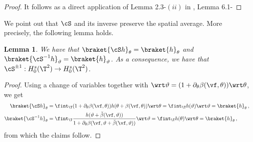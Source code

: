 \documentclass[a4paper,reqno,10pt]{article}
\newtheorem{lem}{Lemma}[section]
\newcommand{\pa}{\partial}
\begin{document}
\begin{proof}
	It follows as a direct application of Lemma 2.3-$(ii)$ in \cite{BM20}, Lemma 6.1-
\end{proof}
We point out that  $\cS$ and its inverse preserve the spatial average. More precisely, the following lemma holds.
\begin{lem}
	We have that $\braket{\cS h}_{\theta}=\braket{h}_{\theta}$ and $\braket{\cS^{-1}h}_{\vartheta} = \braket{h}_{\vartheta}$. As a consequence, we have that $\cS^{\pm 1}:H_0^{s}(\T^2)\to H_0^{s}(\T^2)$.
\end{lem}
\begin{proof}
	Using a change of variables together with $\wrt\vartheta = (1+\pa_{\theta}\beta(\vf,\theta)) \wrt\theta$,
	we get
	\begin{equation}\label{avera}
		\begin{aligned}
			\braket{\cS h}_{\theta} & =  \fint_{\T} (1+\pa_{\theta}\beta (\vf,\theta)) h(\theta+\beta(\vf,\theta)) \wrt\theta=  \fint_{\T} h(\vartheta)  \wrt\vartheta = \braket{h}_{\theta} \,, \\
			\braket{\cS^{-1} h}_{\theta} & =  \fint_{\T} \frac{h(\vartheta+\breve{\beta}(\vf,\vartheta))}{1+\pa_{\theta}\beta(\vf,\vartheta+\breve{\beta}(\vf,\vartheta))} \wrt \vartheta =  \fint_{\T} h(\theta) \wrt\theta = \braket{h}_{\theta} \,,
		\end{aligned}
	\end{equation}
	from which the claims follow.
\end{proof}
\end{document}
